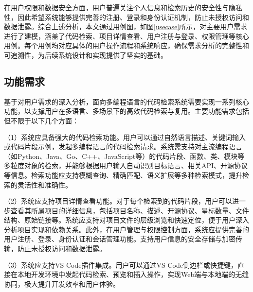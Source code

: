 \documentclass[UTF8,a4paper,12pt]{ctexart}
\numberwithin{equation}{section}
\begin{document}
在用户权限和数据安全方面，用户普遍关注个人信息和检索历史的安全性与隐私性，因此希望系统能够提供完善的注册、登录和身份认证机制，防止未授权访问和数据泄露。综合上述分析，本文通过用例图，如图\ref{usecase}所示，对主要用户需求进行了建模，涵盖了代码检索、项目详情查看、用户注册与登录、权限管理等核心用例。每个用例均对应具体的用户操作流程和系统响应，确保需求分析的完整性和可追溯性，为后续系统设计和实现提供了坚实的基础。\par
\subsection{功能需求}
基于对用户需求的深入分析，面向多编程语言的代码检索系统需要实现一系列核心功能，以支撑用户在多语言、多场景下的高效代码检索与复用。主要功能需求包括但不限于以下几个方面：\par
（1）系统应具备强大的代码检索功能。用户可以通过自然语言描述、关键词输入或代码片段示例，发起多编程语言的代码检索请求。系统需支持对主流编程语言（如Python、Java、Go、C++、JavaScript等）的代码片段、函数、类、模块等多粒度对象的检索，并能够根据用户输入自动识别目标语言、相关API、开源协议等信息。检索功能应支持模糊查询、精确匹配、语义扩展等多种检索模式，提升检索的灵活性和准确性。\par
（2）系统应支持项目详情查看功能。对于每个检索到的代码片段，用户可以进一步查看其所属项目的详细信息，包括项目名称、描述、开源协议、星标数量、文件结构、原始链接等。系统应支持对项目文件的层级浏览和快速定位，便于用户深入分析项目实现和依赖关系。此外，在用户管理与权限控制方面，系统应提供完善的用户注册、登录、身份认证和会话管理功能。支持用户信息的安全存储与加密传输，防止未授权访问和数据泄露。\par
（3）系统应支持VS Code插件集成。用户可以通过VS Code侧边栏或快捷键，直接在本地开发环境中发起代码检索、预览和插入操作，实现Web端与本地端的无缝协同，极大提升开发效率和用户体验。\par
\end{document}
